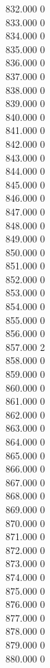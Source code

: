 { 832.000	0 \\
 833.000	0 \\
 834.000	0 \\
 835.000	0 \\
 836.000	0 \\
 837.000	0 \\
 838.000	0 \\
 839.000	0 \\
 840.000	0 \\
 841.000	0 \\
 842.000	0 \\
 843.000	0 \\
 844.000	0 \\
 845.000	0 \\
 846.000	0 \\
 847.000	0 \\
 848.000	0 \\
 849.000	0 \\
 850.000	0 \\
 851.000	0 \\
 852.000	0 \\
 853.000	0 \\
 854.000	0 \\
 855.000	0 \\
 856.000	0 \\
 857.000	2 \\
 858.000	0 \\
 859.000	0 \\
 860.000	0 \\
 861.000	0 \\
 862.000	0 \\
 863.000	0 \\
 864.000	0 \\
 865.000	0 \\
 866.000	0 \\
 867.000	0 \\
 868.000	0 \\
 869.000	0 \\
 870.000	0 \\
 871.000	0 \\
 872.000	0 \\
 873.000	0 \\
 874.000	0 \\
 875.000	0 \\
 876.000	0 \\
 877.000	0 \\
 878.000	0 \\
 879.000	0 \\
 880.000	0 \\
}
